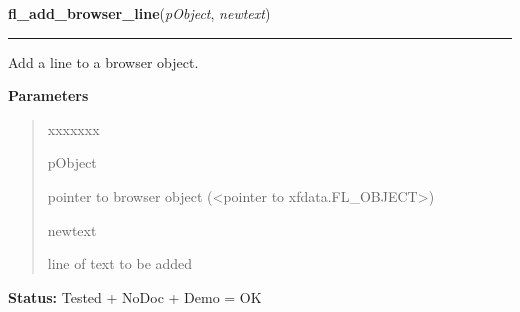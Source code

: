 \hspace{.8\funcindent}\begin{boxedminipage}{\funcwidth}

    \raggedright \textbf{fl\_add\_browser\_line}(\textit{pObject}, \textit{newtext})

    \vspace{-1.5ex}

    \rule{\textwidth}{0.5\fboxrule}
\setlength{\parskip}{2ex}
    Add a line to a browser object.

\setlength{\parskip}{1ex}
      \textbf{Parameters}
      \vspace{-1ex}

      \begin{quote}
        \begin{Ventry}{xxxxxxx}

          \item[pObject]

          pointer to browser object ({\textless}pointer to 
          xfdata.FL\_OBJECT{\textgreater})

          \item[newtext]

          line of text to be added

        \end{Ventry}

      \end{quote}

\textbf{Status:} Tested + NoDoc + Demo = OK



    \end{boxedminipage}

    \label{xformslib:library:fl_addto_browser}

    \vspace{0.5ex}

